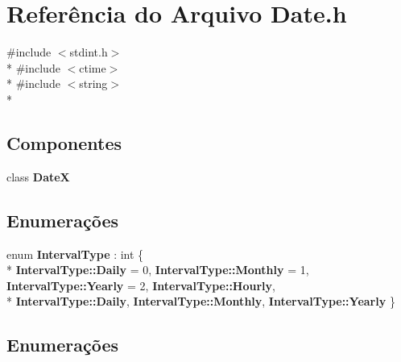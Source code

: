 \section{Referência do Arquivo Date.\+h}
\label{_core_2_date_8h}
{\ttfamily \#include $<$stdint.\+h$>$}\\*
{\ttfamily \#include $<$ctime$>$}\\*
{\ttfamily \#include $<$string$>$}\\*
\subsection*{Componentes}
\begin{DoxyCompactItemize}
\item 
class {\bf DateX}
\end{DoxyCompactItemize}
\subsection*{Enumerações}
\begin{DoxyCompactItemize}
\item 
enum {\bf Interval\+Type} \+: int \{ \\*
{\bf Interval\+Type\+::\+Daily} = 0, 
{\bf Interval\+Type\+::\+Monthly} = 1, 
{\bf Interval\+Type\+::\+Yearly} = 2, 
{\bf Interval\+Type\+::\+Hourly}, 
\\*
{\bf Interval\+Type\+::\+Daily}, 
{\bf Interval\+Type\+::\+Monthly}, 
{\bf Interval\+Type\+::\+Yearly}
 \}
\end{DoxyCompactItemize}


\subsection{Enumerações}
